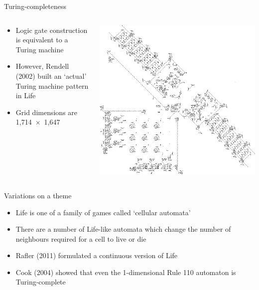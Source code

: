 \documentclass{beamer}
\begin{document}
\begin{frame}{Turing-completeness}
	\begin{columns}
		\begin{column}{0.3\paperwidth}
		\begin{itemize}
			\item Logic gate construction is equivalent to a Turing machine
			\item However, Rendell (2002) built an `actual' Turing machine pattern in Life
			\item Grid dimensions are 1,714~$\times$~1,647
		\end{itemize}
	\end{column}

	\begin{column}{0.7\paperwidth}
		\begin{center}
			\includegraphics[width=\textwidth,height=0.65\textheight,keepaspectratio]{rendell-tm}
		\end{center}
	\end{column}
	\end{columns}
\end{frame}

\begin{frame}{Variations on a theme}
	\begin{itemize}
		\item Life is one of a family of games called `cellular automata'
		\item There are a number of Life-like automata which change the number of neighbours required for a cell to live or die
		\item Rafler (2011) formulated a continuous version of Life
		\item Cook (2004) showed that even the 1-dimensional Rule 110 automaton is Turing-complete
	\end{itemize}
\end{frame}
\end{document}
